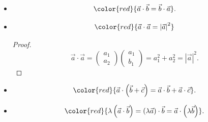 \documentclass[12pt, a4paper]{article}
\newtheorem{proof}{Proof}[subsection]
\begin{document}
\begin{enumerate}
\begin{itemize}
\begin{proof}
      OR $\vec{a}\cdot\vec{b}=-\left|\vec{a}\right|\left|\vec{b}\right|$ for $\vec{a}$ and $\vec{b}$ at opposite directions. 
    \end{proof}
    \item $${\color{red}{\vec{a}\cdot\vec{b}=\vec{b}\cdot\vec{a}}}.$$
    \item $${\color{red}{\vec{a}\cdot\vec{a}=\left|\vec{a}\right|^2}}$$
    \begin{proof}
      $$\vec{a}\cdot\vec{a}=\begin{pmatrix}a_1\\a_2\end{pmatrix}\begin{pmatrix}a_1\\b_1\end{pmatrix}=a_1^2+a_2^2=\left|\vec{a}\right|^2.$$
    \end{proof}
    \item $${\color{red}{\vec{a}\cdot\left(\vec{b}+\vec{c}\right)=\vec{a}\cdot\vec{b}+\vec{a}\cdot\vec{c}}}.$$
    \item $${\color{red}{\lambda\left(\vec{a}\cdot\vec{b}\right)=\left(\lambda\vec{a}\right)\cdot\vec{b}=\vec{a}\cdot\left(\lambda\vec{b}\right)}}.$$
  \end{itemize}
\end{enumerate}
\end{document}
